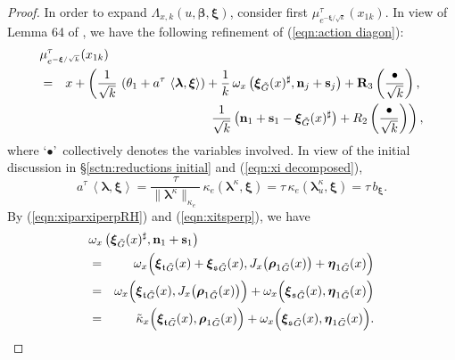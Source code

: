 \documentclass[12pt,a4paper]{article}
\theoremstyle{plain}
\theoremstyle{definition}
\begin{document}
\begin{proof}
In order to expand $\Lambda_{x,k}\left(u,\boldsymbol{\beta},
\boldsymbol{\xi}\right)$, consider first
$\mu^\tau_{e^{-\boldsymbol{\xi}/\sqrt{k}}}(x_{1k})$. In view of Lemma 64 of \cite{gp24}, we have the following refinement of (\ref{eqn:action diagon}):
\begin{eqnarray}
\label{eqn:mu action resc}
\lefteqn{
\mu^\tau_{e^{-\boldsymbol{\xi}/\sqrt{k}}}(x_{1k})}\\
&=&x+\left(\frac{1}{\sqrt{k}}\,\left(\theta_1+a^\tau\,\left\langle\boldsymbol{\lambda},\boldsymbol{\xi}\right\rangle  \right)+
\frac{1}{k}\,\omega_x \left(\boldsymbol{\xi}_{\tilde{G}}(x)^\sharp,\mathbf{n}_j+\mathbf{s}_j\right)
+\mathbf{R}_3\left(\frac{\bullet}{\sqrt{k}}\right),
\right.\nonumber\\
&&\left. \frac{1}{\sqrt{k}}\,\big(
\mathbf{n}_1+\mathbf{s}_1
-\boldsymbol{\xi}_{\tilde{G}}(x)^\sharp\big)
+R_2\left(\frac{\bullet}{\sqrt{k}}\right)    \right),\nonumber
\end{eqnarray}
where \lq$\bullet$\rq\, collectively denotes the variables involved.
In view of
the initial discussion in \S \ref{sctn:reductions initial}
and (\ref{eqn:xi decomposed}),
\begin{equation}
\label{eqn:val ataulambda xi}
a^\tau\,\left\langle\boldsymbol{\lambda},\boldsymbol{\xi}\right\rangle =\frac{\tau}{\|\boldsymbol{\lambda}^\kappa\|_{\kappa_e}}
\,\kappa_e\left(\boldsymbol{\lambda}^\kappa,\boldsymbol{\xi}\right)=\tau\,\kappa_e
\left(\boldsymbol{\lambda}^\kappa_u,
\boldsymbol{\xi}\right)=\tau\,b_{\boldsymbol{\xi}}.
\end{equation}
By (\ref{eqn:xiparxiperpRH})
and (\ref{eqn:xitsperp}), we have
\begin{eqnarray}
\label{eqn:omegaxins}
\lefteqn{\omega_x \left(\boldsymbol{\xi}_{\tilde{G}}(x)^\sharp,\mathbf{n}_1+\mathbf{s}_1\right)}\\
&=&
\omega_x \Big(
{\boldsymbol{\xi}_{\mathfrak{t}}}_{\tilde{G}}(x)
+{\boldsymbol{\xi}_{\mathfrak{s}}}_{\tilde{G}}(x),
J_x\big({\boldsymbol{\rho}_1}_{\tilde{G}}(x)\big)
+{\boldsymbol{\eta}_1}_{\tilde{G}}(x)\Big)
\nonumber\\
&=&\omega_x \Big(
{\boldsymbol{\xi}_{\mathfrak{t}}}_{\tilde{G}}(x)
,
J_x\big({\boldsymbol{\rho}_1}_{\tilde{G}}(x)\big)\Big)
+\omega_x \Big(
{\boldsymbol{\xi}_{\mathfrak{s}}}_{\tilde{G}}(x),
{\boldsymbol{\eta}_1}_{\tilde{G}}(x)\Big)
\nonumber\\
&=&\tilde{\kappa}_x \Big(
{\boldsymbol{\xi}_{\mathfrak{t}}}_{\tilde{G}}(x)
,
{\boldsymbol{\rho}_1}_{\tilde{G}}(x)\Big)
+\omega_x \Big(
{\boldsymbol{\xi}_{\mathfrak{s}}}_{\tilde{G}}(x),
{\boldsymbol{\eta}_1}_{\tilde{G}}(x)\Big).
\nonumber
\end{eqnarray}


\end{proof}
\end{document}
